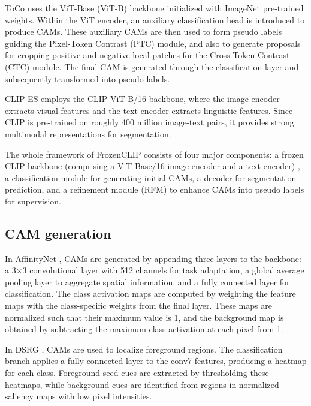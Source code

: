 ToCo \cite{wsss_toco_token_contrast} uses the ViT-Base (ViT-B) backbone initialized with ImageNet pre-trained weights. Within the ViT encoder, an auxiliary classification head is introduced to produce CAMs. These auxiliary CAMs are then used to form pseudo labels guiding the Pixel-Token Contrast (PTC) module, and also to generate proposals for cropping positive and negative local patches for the Cross-Token Contrast (CTC) module. The final CAM is generated through the classification layer and subsequently transformed into pseudo labels.

CLIP-ES \cite{wsss_clip_es} employs the CLIP ViT-B/16 backbone, where the image encoder extracts visual features and the text encoder extracts linguistic features. Since CLIP is pre-trained on roughly 400 million image-text pairs, it provides strong multimodal representations for segmentation.

The whole framework of FrozenCLIP \cite{wsss_frozen_clip} consists of four major components: a frozen CLIP backbone (comprising a ViT-Base/16 image encoder and a text encoder) \cite{transformer_vit}, a classification module for generating initial CAMs, a decoder for segmentation prediction, and a refinement module (RFM) to enhance CAMs into pseudo labels for supervision.

\subsection{CAM generation}
\label{subsec:cam-generation}
In AffinityNet \cite{wsss_affinitynet}, CAMs are generated by appending three layers to the backbone: a 3×3 convolutional layer with 512 channels for task adaptation, a global average pooling layer to aggregate spatial information, and a fully connected layer for classification. The class activation maps are computed by weighting the feature maps with the class-specific weights from the final layer. These maps are normalized such that their maximum value is 1, and the background map is obtained by subtracting the maximum class activation at each pixel from 1.

In DSRG \cite{wsss_dsrg_deep_seeded_region_growing}, CAMs \cite{cam} are used to localize foreground regions. The classification branch applies a fully connected layer to the conv7 features, producing a heatmap for each class. Foreground seed cues are extracted by thresholding these heatmaps, while background cues are identified from regions in normalized saliency maps with low pixel intensities.

